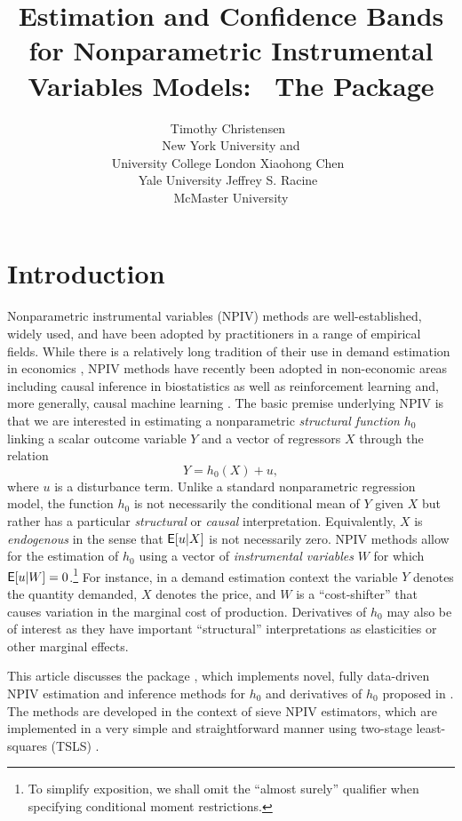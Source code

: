 \documentclass[
]{jss}
\author{
Timothy Christensen~\orcidlink{0000-0002-4639-5015}\\New York University
and\\
University College London \And Xiaohong
Chen~\orcidlink{0000-0003-1125-675X}\\Yale University \And Jeffrey S.
Racine~\orcidlink{0000-0002-5680-3705}\\McMaster University
}
\title{Estimation and Confidence Bands for Nonparametric Instrumental
Variables Models: ~The \proglang{R} Package \pkg{npiv}}
\begin{document}
\hypertarget{introduction}{%
\section{Introduction}\label{introduction}}

Nonparametric instrumental variables (NPIV) methods are
well-established, widely used, and have been adopted by practitioners in
a range of empirical fields. While there is a relatively long tradition
of their use in demand estimation in economics
\citep{BCK, BHP, BerryHaile2014}, NPIV methods have recently been
adopted in non-economic areas including causal inference in
biostatistics \citep{WangZhiTT2018} as well as reinforcement learning
\citep{grettonRL2021} and, more generally, causal machine learning
\citep{causalML}. The basic premise underlying NPIV is that we are
interested in estimating a nonparametric \emph{structural function}
\(h_0\) linking a scalar outcome variable \(Y\) and a vector of
regressors \(X\) through the relation \begin{equation}\label{eq:npiv}
 Y = h_0(X) + u,
\end{equation} where \(u\) is a disturbance term. Unlike a standard
nonparametric regression model, the function \(h_0\) is not necessarily
the conditional mean of \(Y\) given \(X\) but rather has a particular
\emph{structural} or \emph{causal} interpretation. Equivalently, \(X\)
is \emph{endogenous} in the sense that \(\mathsf{E}[u|X]\) is not necessarily
zero. NPIV methods allow for the estimation of \(h_0\) using a vector of
\emph{instrumental variables} \(W\) for which
\(\mathsf{E}[u|W] = 0\).\footnote{To simplify exposition, we shall omit the
  ``almost surely'' qualifier when specifying conditional moment
  restrictions.} For instance, in a demand estimation context the
variable \(Y\) denotes the quantity demanded, \(X\) denotes the price,
and \(W\) is a ``cost-shifter'' that causes variation in the marginal
cost of production. Derivatives of \(h_0\) may also be of interest as
they have important ``structural'' interpretations as elasticities or
other marginal effects.

This article discusses the  package , which
implements novel, fully data-driven NPIV estimation and inference
methods for \(h_0\) and derivatives of \(h_0\) proposed in \citet{CCK}.
The methods are developed in the context of sieve NPIV estimators, which
are implemented in a very simple and straightforward manner using
two-stage least-squares (TSLS) \citep{AC, NP}.
\end{document}
